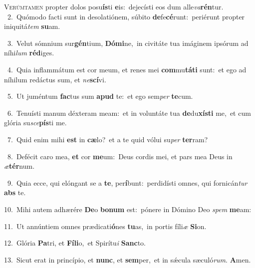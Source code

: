\lettrine{\initial\textcolor{\initialcolor}{V}}{erúmtamen} propter dolos posu\-\textbf{ís}\-ti \textbf{e}\-is:~\star dejecísti eos dum alle\-\textit{va}\-\textbf{rén}tur.\\
{\numbfont\textcolor{\numbcolor}{~2.}}~Quómodo facti sunt in desolatiónem, súbito \textbf{de}\-fe\-\textbf{cé}\-runt:~\star periérunt propter iniquitá\textit{tem} \textbf{su}\-am.\par
{\numbfont\textcolor{\numbcolor}{~3.}}~Velut sómnium sur\-\textbf{gén}\-tium, \textbf{Dó}\-\textbf{mi}ne,~\star in civitáte tua imáginem ipsórum ad níhi\textit{lum} \textbf{réd}\-iges.\par
{\numbfont\textcolor{\numbcolor}{~4.}}~Quia inflammátum est cor meum, et renes mei \textbf{com}\-mu\-\textbf{tá}\-\textbf{ti} sunt:~\star et ego ad níhilum redáctus sum, et \textit{ne}\-\textbf{scí}vi.\par
{\numbfont\textcolor{\numbcolor}{~5.}}~Ut juméntum \textbf{fac}\-tus sum \textbf{a}\-\textbf{pud} te:~\star et ego sem\textit{per} \textbf{te}\-cum.\par
{\numbfont\textcolor{\numbcolor}{~6.}}~Tenuísti manum déxteram meam:~\dagger et in voluntáte tua \textbf{de}\-du\-\textbf{xís}\-\textbf{ti} me,~\star et cum glória su\-\textit{sce}\-\textbf{pís}ti me.\par
{\numbfont\textcolor{\numbcolor}{~7.}}~Quid enim mihi \textbf{est} in \textbf{cæ}\-lo?~\star et a te quid vólui su\textit{per} \textbf{ter}\-ram?\par
{\numbfont\textcolor{\numbcolor}{~8.}}~Defécit caro mea, \textbf{et} cor \textbf{me}\-um:~\star Deus cordis mei, et pars mea Deus in \textit{æ}\-\textbf{tér}num.\par
{\numbfont\textcolor{\numbcolor}{~9.}}~Quia ecce, qui elóngant se a \textbf{te}\-, per\-\textbf{í}\-bunt:~\star perdidísti omnes, qui fornicán\textit{tur} \textbf{abs} te.\par
{\numbfont\textcolor{\numbcolor}{10.}}~Mihi autem adhærére \textbf{De}\-o \textbf{bo}\-\textbf{num} est:~\star pónere in Dómino Deo \textit{spem} \textbf{me}\-am:\par
{\numbfont\textcolor{\numbcolor}{11.}}~Ut annúntiem omnes prædicati\-\textbf{ó}\-nes \textbf{tu}\-as,~\star in portis fíli\textit{æ} \textbf{Si}\-on.\par
{\numbfont\textcolor{\numbcolor}{12.}}~Glória \textbf{Pa}\-tri, et \textbf{Fí}\-\textbf{li}o,~\star et Spirítu\textit{i} \textbf{Sanc}\-to.\par
{\numbfont\textcolor{\numbcolor}{13.}}~Sicut erat in princípio, et \textbf{nunc}\-, et \textbf{sem}\-per,~\star et in sǽcula sæculó\-\textit{rum}\-. \textbf{A}\-men.\par
